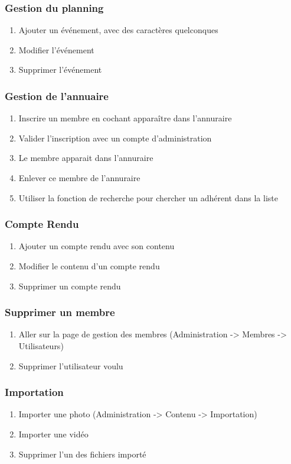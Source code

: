 \documentclass[11pt]{report}
\begin{document}
\subsubsection{Gestion du planning}
\begin{enumerate}
\item Ajouter un événement, avec des caractères quelconques
\item Modifier l’événement
\item Supprimer l’événement
\end{enumerate}
\subsubsection{Gestion de l'annuaire}
\begin{enumerate}
\item Inscrire un membre en cochant \og apparaître dans l'annuraire \fg{}
\item Valider l'inscription avec un compte d'administration
\item Le membre apparait dans l'annuraire
\item Enlever ce membre de l'annuraire
\item Utiliser la fonction de recherche pour chercher un adhérent dans la liste
\end{enumerate}
\subsubsection{Compte Rendu}
\begin{enumerate}
\item Ajouter un compte rendu avec son contenu
\item Modifier le contenu d’un compte rendu
\item Supprimer un compte rendu
\end{enumerate}
\subsubsection{Supprimer un membre}
\begin{enumerate}
 \item Aller sur la page de gestion des membres (Administration -> Membres -> Utilisateurs)
 \item Supprimer l'utilisateur voulu
\end{enumerate}

\subsubsection{Importation}
\begin{enumerate}
 \item Importer une photo (Administration -> Contenu -> Importation)
 \item Importer une vidéo
 \item Supprimer l'un des fichiers importé
\end{enumerate}
\end{document}
